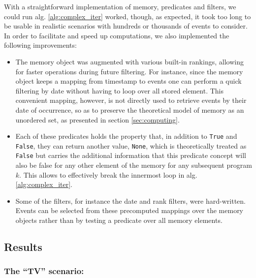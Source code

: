 \documentclass[entropy,article,submit,moreauthors,pdftex]{Definitions/mdpi}
\begin{document}
With a straightforward implementation of memory, predicates and filters, we could run alg. \ref{alg:complex_iter} worked, though, as expected, it took too
long to be usable in realistic scenarios with hundreds or thousands of events to
consider. In order to facilitate and speed up computations, we also implemented
the following improvements:
\begin{itemize}
    \item The memory object was augmented with various built-in rankings, allowing
          for faster operations during future filtering. For instance, since the memory
          object keeps a mapping from timestamp to events one can perform a quick
          filtering by date without having to loop over all stored element. This convenient mapping,
          however, is not directly used to retrieve events by their date of occurrence, so as to
          preserve the theoretical model of memory as an unordered set, as presented in
          section \ref{sec:computing}.


    \item Each of these predicates holds the property that, in addition to
          \texttt{True} and \texttt{False}, they can return another value,
          \texttt{None}, which is theoretically treated as \texttt{False} but carries
          the additional information that this predicate concept will also be false for
          any other element of the memory for any subsequent program $k$. This allows to
          effectively break the innermost loop in alg. \ref{alg:complex_iter}.

    \item Some of the filters, for instance the date and rank filters, were
          hard-written. Events can be selected from these precomputed mappings over the memory objects
          rather than by testing a predicate over all memory elements.
\end{itemize}


\subsection{Results}
\label{sec:example}

\subsubsection{The ``TV'' scenario:}
\end{document}
